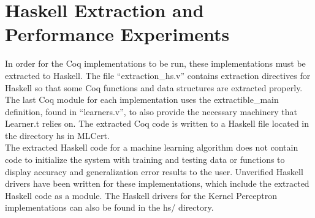 \section{Haskell Extraction and Performance Experiments}\label{HaskellExtractionPerformance}
In order for the Coq implementations to be run, these implementations must be extracted to Haskell. The file ``extraction\_hs.v'' contains extraction directives for Haskell so that some Coq functions and data structures are extracted properly. The last Coq module for each implementation uses the extractible\_main definition, found in ``learners.v'', to also provide the necessary machinery that Learner.t relies on. The extracted Coq code is written to a Haskell file located in the directory hs in MLCert.
\\The extracted Haskell code for a machine learning algorithm does not contain code to initialize the system with training and testing data or functions to display accuracy and generalization error results to the user. Unverified Haskell drivers have been written for these implementations, which include the extracted Haskell code as a module. The Haskell drivers for the Kernel Perceptron implementations can also be found in the hs/ directory.
